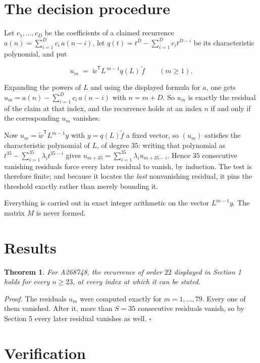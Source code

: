 \documentclass[11pt]{article}
\newtheorem{theorem}{Theorem}
\theoremstyle{definition}
\begin{document}
\section{The decision procedure}

Let $c_1,\dots,c_D$ be the coefficients of a claimed recurrence $a(n) = \sum_{i=1}^{D} c_i\,a(n-i)$, let $q(t) = t^{D} - \sum_{i=1}^{D} c_i t^{D-i}$ be its characteristic polynomial, and put

\[u_m \;=\; \tilde w^{\mathsf T} L^{\,m-1} q(L)\,\tilde f \qquad (m \ge 1).\]

Expanding the powers of $L$ and using the displayed formula for $a$, one gets $u_m = a(n) - \sum_{i=1}^{D} c_i\,a(n-i)$ with $n = m + D$. So $u_m$ is exactly the residual of the claim at that index, and the recurrence holds at an index $n$ if and only if the corresponding $u_m$ vanishes.

Now $u_m = \tilde w^{\mathsf T} L^{m-1} y$ with $y = q(L)\tilde f$ a fixed vector, so $(u_m)$ satisfies the characteristic polynomial of $L$, of degree $35$: writing that polynomial as $t^{35} - \sum_{i=1}^{35} \lambda_i t^{35-i}$ gives $u_{m+35} = \sum_{i=1}^{35} \lambda_i u_{m+35-i}$. Hence $35$ consecutive vanishing residuals force every later residual to vanish, by induction. The test is therefore finite; and because it locates the {\itshape last} nonvanishing residual, it pins the threshold exactly rather than merely bounding it.

Everything is carried out in exact integer arithmetic on the vector $L^{m-1}y$. The matrix $M$ is never formed.

\section{Results}

\begin{theorem} For A268748, the recurrence of order $22$ displayed in Section 1 holds for every $n \ge 23$, at every index at which it can be stated.\end{theorem}

{\itshape Proof.} The residuals $u_m$ were computed exactly for $m = 1,\dots,79$. Every one of them vanished. After it, more than $S = 35$ consecutive residuals vanish, so by Section 5 every later residual vanishes as well. $\square$

\section{Verification}
\end{document}
